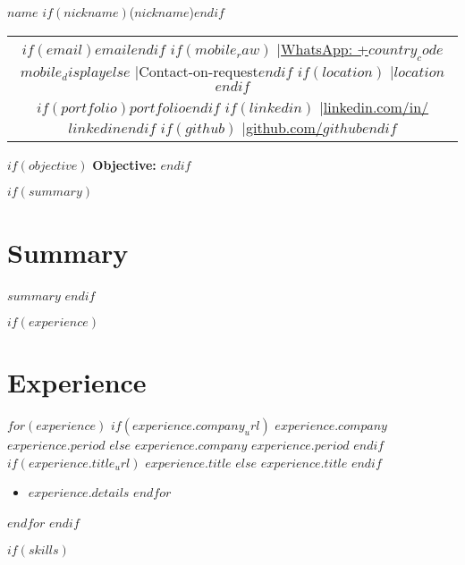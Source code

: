 \documentclass[10.5pt,a4paper]{article}
\newcommand{\daterange}[1]{\textbf{#1}}
\newcommand{\entryHeader}[2]{\noindent\textbf{#1} \hfill \daterange{#2}}
\newcommand{\entryHeaderLinked}[3]{\noindent\textbf{\href{#1}{#2}} \hfill \daterange{#3}}
\newcommand{\entrySubHeader}[1]{\textit{#1}}
\newcommand{\entrySubHeaderLinked}[2]{\textit{\href{#1}{#2}}}
\newenvironment{entryDetails}
  {%
    \begin{itemize}[leftmargin=2.5em, rightmargin=2.5em, itemsep=0.5pt, topsep=1pt, parsep=0pt]
  }
  {%
    \end{itemize}
    \vspace{-0.1cm}
  }
\begin{document}
\pagecolor{paperbg}

\begin{center}
	{\Huge \textbf{\helveticabold $name$} $if(nickname)$(\helveticabold $nickname$)$endif$} \\
	\vspace{2pt}
	\begin{tabular}{@{}c@{}}
		$if(email)$\href{mailto:$email$}{$email$}$endif$
		$if(mobile_raw)$ \quad|\quad \href{https://wa.me/$country_code$$mobile_raw$}{WhatsApp: +$country_code$ $mobile_display$}$else$ \quad|\quad Contact-on-request$endif$
		$if(location)$ \quad|\quad $location$$endif$                                                          \\[2pt]
		$if(portfolio)$\href{https://$portfolio$?utm_source=resume & utm_medium=document}{$portfolio$}$endif$
		$if(linkedin)$ \quad|\quad \href{https://www.linkedin.com/in/$linkedin$}{linkedin.com/in/$linkedin$}$endif$
		$if(github)$ \quad|\quad \href{https://github.com/$github$}{github.com/$github$}$endif$
	\end{tabular}
\end{center}

$if(objective)$
{\large\bfseries\color{sectioncolor}Objective:} 
\vspace{3pt}
$endif$

$if(summary)$
\section*{Summary}
$summary$
$endif$

$if(experience)$
\section*{Experience}
$for(experience)$
$if(experience.company_url)$
\entryHeaderLinked{$experience.company_url$}{$experience.company$}{$experience.period$}
$else$
\entryHeader{$experience.company$}{$experience.period$}
$endif$
\\
$if(experience.title_url)$
\entrySubHeaderLinked{$experience.title_url$}{$experience.title$}
$else$
\entrySubHeader{$experience.title$}
$endif$
\begin{entryDetails}
	$for(experience.details)$
	\item $experience.details$
	$endfor$
\end{entryDetails}
$endfor$
$endif$

$if(skills)$
\end{document}
